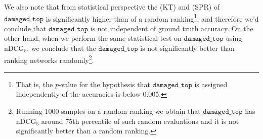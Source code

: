 We also note that from statistical perspective the (KT) and (SPR) of $\texttt{damaged\_top}$ is significantly higher than of a random ranking\footnote{That is, the $p$-value for the hypothesis that $\texttt{damaged\_top}$ is assigned independently of the accuracies is below 0.005.}, and therefore we'd conclude that $\texttt{damaged\_top}$ is not independent of ground truth accuracy. On the other hand, when we perform the same statistical test on $\texttt{damaged\_top}$ using $\text{nDCG}_{5}$, we conclude that the $\texttt{damaged\_top}$ is not significantly better than ranking networks randomly\footnote{Running 1000 samples on a random ranking we obtain that $\texttt{damaged\_top}$ has $\text{nDCG}_{5}$ around 75th percentile of such random evaluations and it is not significantly better than a random ranking.}.


